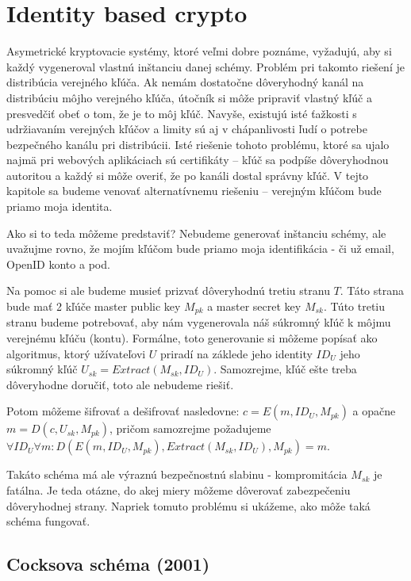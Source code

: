 \section{Identity based crypto}

Asymetrické kryptovacie systémy, ktoré veľmi dobre poznáme, vyžadujú,
aby si každý vygeneroval vlastnú inštanciu danej schémy. Problém pri
takomto riešení je distribúcia verejného kľúča. Ak nemám dostatočne
dôveryhodný kanál na distribúciu môjho verejného kľúča, útočník si
môže pripraviť vlastný kľúč a presvedčiť obeť o tom, že je to môj
kľúč. Navyše, existujú isté ťažkosti s udržiavaním verejných kľúčov a
limity sú aj v chápanlivosti ľudí o potrebe bezpečného kanálu pri
distribúcii.
Isté riešenie tohoto problému,
ktoré sa ujalo najmä pri webových aplikáciach sú certifikáty --
kľúč sa podpíše dôveryhodnou autoritou a každý si môže
overiť, že po kanáli dostal správny kľúč. V tejto kapitole sa budeme
venovať alternatívnemu riešeniu -- verejným kľúčom bude priamo moja
identita.

Ako si to teda môžeme predstaviť? Nebudeme generovať inštanciu schémy,
ale uvažujme rovno, že mojím kľúčom bude priamo moja identifikácia -
či už email, OpenID konto a pod.

Na pomoc si ale budeme musieť prizvať dôveryhodnú tretiu stranu $T$.
Táto strana bude mať 2 kľúče master public key $M_{pk}$ a master
secret key $M_{sk}$. Túto tretiu stranu budeme potrebovať, aby nám
vygenerovala náš súkromný kľúč k môjmu verejnému kľúču (kontu).
Formálne, toto generovanie si môžeme popísať ako algoritmus, ktorý
užívateľovi $U$ priradí na záklede jeho identity $ID_U$ jeho súkromný
kľúč $U_{sk} = Extract(M_{sk}, ID_U)$. Samozrejme, kľúč ešte treba
dôveryhodne doručiť, toto ale nebudeme riešiť.

Potom môžeme šifrovať a dešifrovať nasledovne:
$c=E(m,ID_U,M_{pk})$ a opačne $m = D(c, U_{sk}, M_{pk})$, pričom
samozrejme požadujeme
$\forall ID_U \forall m: D(E(m, ID_U, M_{pk}), Extract(M_{sk},ID_U),
M_{pk})=m$.

Takáto schéma má ale výraznú bezpečnostnú slabinu - kompromitácia
$M_{sk}$ je fatálna. Je teda otázne, do akej miery môžeme dôverovať
zabezpečeniu dôveryhodnej strany. Napriek tomuto problému si ukážeme,
ako môže taká schéma fungovať.

\subsection{Cocksova schéma (2001)}


